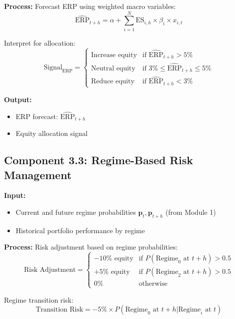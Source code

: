 \documentclass[11pt,a4paper]{article}
\begin{document}
\textbf{Process:}
Forecast ERP using weighted macro variables:
\begin{equation}
    \widehat{\text{ERP}}_{t+h} = \alpha + \sum_{i=1}^{N} \text{ES}_{i,h} \times \beta_i \times x_{i,t}
\end{equation}

Interpret for allocation:
\begin{equation}
    \text{Signal}_{\text{ERP}} = \begin{cases}
        \text{Increase equity} & \text{if } \widehat{\text{ERP}}_{t+h} > 5\% \\
        \text{Neutral equity} & \text{if } 3\% \leq \widehat{\text{ERP}}_{t+h} \leq 5\% \\
        \text{Reduce equity} & \text{if } \widehat{\text{ERP}}_{t+h} < 3\%
    \end{cases}
\end{equation}

\textbf{Output:}
\begin{itemize}
    \item ERP forecast: $\widehat{\text{ERP}}_{t+h}$
    \item Equity allocation signal
\end{itemize}

\subsection{Component 3.3: Regime-Based Risk Management}

\textbf{Input:}
\begin{itemize}
    \item Current and future regime probabilities $\mathbf{p}_t, \mathbf{p}_{t+h}$ (from Module 1)
    \item Historical portfolio performance by regime
\end{itemize}

\textbf{Process:}
Risk adjustment based on regime probabilities:
\begin{equation}
    \text{Risk Adjustment} = \begin{cases}
        -10\% \text{ equity} & \text{if } P(\text{Regime}_0 \text{ at } t+h) > 0.5 \\
        +5\% \text{ equity} & \text{if } P(\text{Regime}_2 \text{ at } t+h) > 0.5 \\
        0\% & \text{otherwise}
    \end{cases}
\end{equation}

Regime transition risk:
\begin{equation}
    \text{Transition Risk} = -5\% \times P(\text{Regime}_0 \text{ at } t+h | \text{Regime}_i \text{ at } t)
\end{equation}
\end{document}
